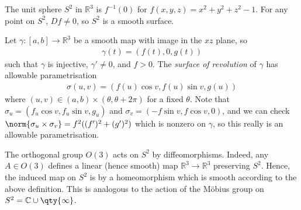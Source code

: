 \begin{example}
	The unit sphere $S^2$ in $\mathbb R^3$ is $f^{-1}(0)$ for $f(x,y,z) = x^2 + y^2 + z^2 - 1$.
	For any point on $S^2$, $Df \neq 0$, so $S^2$ is a smooth surface.
\end{example}

\begin{example}
	Let $\gamma \colon [a,b] \to \mathbb R^3$ be a smooth map with image in the $xz$ plane, so
	\begin{align*}
		\gamma(t) = (f(t), 0, g(t))
	\end{align*}
	such that $\gamma$ is injective, $\gamma' \neq 0$, and $f > 0$.
	The \textit{surface of revolution} of $\gamma$ has allowable parametrisation
	\begin{align*}
		\sigma(u,v) = (f(u)\cos v, f(u)\sin v, g(u))
	\end{align*}
	where $(u,v) \in (a,b) \times (\theta, \theta + 2\pi)$ for a fixed $\theta$.
	Note that $\sigma_u = (f_u \cos v, f_u \sin v, g_u)$ and $\sigma_v = (-f\sin v, f \cos v, 0)$, and we can check $\norm{\sigma_u \times \sigma_v} = f^2 ((f')^2 + (g')^2)$ which is nonzero on $\gamma$, so this really is an allowable parametrisation.
\end{example}

\begin{example}
	The orthogonal group $O(3)$ acts on $S^2$ by diffeomorphisms.
	Indeed, any $A \in O(3)$ defines a linear (hence smooth) map $\mathbb R^3 \to \mathbb R^3$ preserving $S^2$.
	Hence, the induced map on $S^2$ is by a homeomorphism which is smooth according to the above definition.
	This is analogous to the action of the M\"obius group on $S^2 = \mathbb C \cup \qty{\infty}$.
\end{example}

